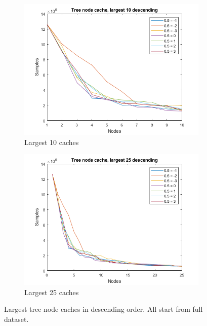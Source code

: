 \begin{figure}
    \centering
    \begin{subfigure}[b]{.45\textwidth}
        \centering
        \includegraphics[width=\textwidth]{figures/treenodecache-10.png}
        \caption{Largest 10 caches}
        \label{sfig:tree:treecache10}
    \end{subfigure}
    \hfill
    \begin{subfigure}[b]{.45\textwidth}
        \centering
        \includegraphics[width=\textwidth]{figures/treenodecache-25.png}
        \caption{Largest 25 caches}
        \label{sfig:tree:treecache25}
    \end{subfigure}
    \caption{Largest tree node caches in descending order. All start from full dataset.}
    \label{fig:tree:treecache}
\end{figure}

